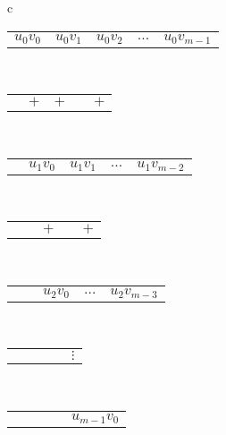 \begin{frame}[fragile]
\begin{center}
\begin{tabular}{c}
\begin{tabular}{C{0.8cm}C{0.8cm}C{0.8cm}C{0.5cm}C{0.8cm}}
      $u_0 v_0$ & $u_0 v_1$ & $u_0 v_2$ & $\ldots$ & $u_0v_{m-1}$
    \end{tabular}\\[-0.7ex]
    \begin{tabular}{C{0.8cm}C{0.8cm}C{0.8cm}C{0.5cm}C{0.8cm}}
       & $+$ & $+$ &  & $+$
    \end{tabular}\\[-0.7ex]
    \begin{tabular}{C{0.8cm}C{0.8cm}C{0.8cm}C{0.5cm}C{0.8cm}}
       & $u_1v_0$ & $u_1v_1$ & $\ldots$ & $u_1v_{m-2}$
    \end{tabular}\\[-0.7ex]
    \begin{tabular}{C{0.8cm}C{0.8cm}C{0.8cm}C{0.5cm}C{0.8cm}}
       & & $+$ &  & $+$
    \end{tabular}\\[-0.7ex]
    \begin{tabular}{C{0.8cm}C{0.8cm}C{0.8cm}C{0.5cm}C{0.8cm}}
       & & $u_2v_0$ & $\ldots$ & $u_2v_{m-3}$
    \end{tabular}\\[-0.7ex]
    \begin{tabular}{C{0.8cm}C{0.8cm}C{0.8cm}C{0.5cm}C{0.8cm}}
       & & &  & $\vdots$
    \end{tabular}\\[-0.7ex]
    \begin{tabular}{C{0.8cm}C{0.8cm}C{0.8cm}C{0.5cm}C{0.8cm}}
       & & & & $u_{m-1}v_0$
    \end{tabular}
  \end{tabular}
\end{center}
\end{frame}


